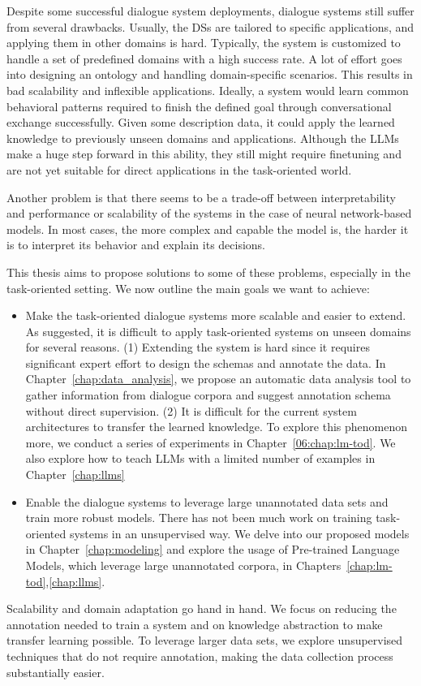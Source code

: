 Despite some successful dialogue system deployments, dialogue systems still suffer from several drawbacks.
Usually, the DSs are tailored to specific applications, and applying them in other domains is hard.
Typically, the system is customized to handle a set of predefined domains with a high success rate.
A lot of effort goes into designing an ontology and handling domain-specific scenarios.
This results in bad scalability and inflexible applications.
Ideally, a system would learn common behavioral patterns required to finish the defined goal through conversational exchange successfully.
Given some description data, it could apply the learned knowledge to previously unseen domains and applications.
Although the LLMs make a huge step forward in this ability, they still might require finetuning and are not yet suitable for direct applications in the task-oriented world.

Another problem is that there seems to be a trade-off between interpretability and performance or scalability of the systems in the case of neural network-based models.
In most cases, the more complex and capable the model is, the harder it is to interpret its behavior and explain its decisions.

This thesis aims to propose solutions to some of these problems, especially in the task-oriented setting.
We now outline the main goals we want to achieve:
\begin{itemize}
    \item Make the task-oriented dialogue systems more scalable and easier to extend. As suggested, it is difficult to apply task-oriented systems on unseen domains for several reasons. (1) Extending the system is hard since it requires significant expert effort to design the schemas and annotate the data. In Chapter~\ref{chap:data_analysis}, we propose an automatic data analysis tool to gather information from dialogue corpora and suggest annotation schema without direct supervision.
    (2) It is difficult for the current system architectures to transfer the learned knowledge. To explore this phenomenon more, we conduct a series of experiments in Chapter~\ref{06:chap:lm-tod}. We also explore how to teach LLMs with a limited number of examples in Chapter~\ref{chap:llms}
    \item Enable the dialogue systems to leverage large unannotated data sets and train more robust models. There has not been much work on training task-oriented systems in an unsupervised way. We delve into our proposed models in Chapter~\ref{chap:modeling} and explore the usage of Pre-trained Language Models, which leverage large unannotated corpora, in Chapters~\ref{chap:lm-tod},\ref{chap:llms}.
\end{itemize}

Scalability and domain adaptation go hand in hand.
We focus on reducing the annotation needed to train a system and on knowledge abstraction to make transfer learning possible.
To leverage larger data sets, we explore unsupervised techniques that do not require annotation, making the data collection process substantially easier.



